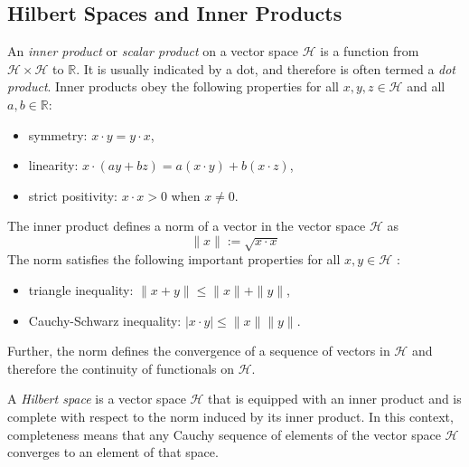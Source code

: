 \documentclass[\topdir/lecture\_notes.tex]{subfiles}
\begin{document}
\subsection{Hilbert Spaces and Inner Products}
An \emph{inner product} or \emph{scalar product} on a vector space \(\mathcal{H}\) is a function from \(\mathcal{H} \times \mathcal{H}\) to \(\mathbb{R}\). It is usually indicated by a dot, and therefore is often termed a \emph{dot product}. Inner products obey the following properties for all \(x, y, z \in \mathcal{H}\) and all \(a, b \in \mathbb{R}\):
\begin{itemize}
  \item symmetry: \(x \cdot y=y \cdot x\),
  \item linearity: \(x \cdot(a y+b z)=a(x \cdot y)+b(x \cdot z)\),
  \item strict positivity: \(x \cdot x>0\) when \(x \neq 0\).
\end{itemize}
The inner product defines a norm of a vector in the vector space \(\mathcal{H}\) as
\begin{equation*}
\|x\| := \sqrt{x \cdot x} \label{eq:hilbert_norm} 
\end{equation*}
The norm satisfies the following important properties for all \(x, y \in \mathcal{H}\) :
\begin{itemize}
  \item triangle inequality: \(\|x+y\| \leq\|x\|+\|y\|\),
  \item Cauchy-Schwarz inequality: \(|x \cdot y| \leq\|x\|\|y\|\).
\end{itemize}
Further, the norm defines the convergence of a sequence of vectors in \(\mathcal{H}\) and therefore the continuity of functionals on \(\mathcal{H}\).

A \emph{Hilbert space} is a vector space \(\mathcal{H}\) that is equipped with an inner product and is complete with respect to the norm induced by its inner product. In this context, completeness means that any Cauchy sequence of elements of the vector space \(\mathcal{H}\) converges to an element of that space.
\end{document}
